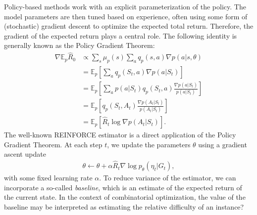 \documentclass[a4paper]{article}
\theoremstyle{definition}
\theoremstyle{plain}
\begin{document}
Policy-based methods work with an explicit parameterization of the policy. The
model parameters are then tuned based on experience, often using some form of
(stochastic) gradient descent to optimize the expected total return.
%
Therefore, the gradient of the expected return
plays a central role. The
following identity is generally known as the Policy Gradient Theorem:
\begin{align*}
  \nabla \mathbb{E}_{p} \hat{R}_{0} &\propto \sum_{s} \mu_{p}(s) \sum_{a} q_{p}(s, a) \nabla p(a | s, \theta) \\
  &= \mathbb{E}_{p}\left[ \sum_{a} q_{p} (S_{t}, a) \nabla p (a | S_{t}) \right] \\
  &= \mathbb{E}_{p}\left[ \sum_{a} p(a | S_{t}) q_{p} (S_{t}, a) \frac{\nabla p (a | S_{t})}{p (a | S_{t})} \right] \\
  &= \mathbb{E}_{p}\left[ q_{p} (S_{t}, A_{t}) \frac{\nabla p (A_{t} | S_{t})}{p (A_{t} | S_{t})} \right] \\
  &= \mathbb{E}_{p} \left[ \hat{R}_{t} \log \nabla p (A_{t} | S_{t}) \right] .
\end{align*}
%
The well-known REINFORCE estimator is a direct application of the Policy
Gradient Theorem. At each step $t$, we update the parameters $\theta$ using a
gradient ascent update
\begin{align*}
  \theta \leftarrow \theta + \alpha \hat{R}_{t} \nabla \log p_{\theta}(\eta_{t} | G_{t}) ,
\end{align*}
with some fixed learning rate $\alpha$.
To reduce variance of the estimator, we can incorporate a so-called
\textit{baseline}, which is an estimate of the expected return of the current
state.
%
In the context of combinatorial optimization, the value of the baseline may be
interpreted as estimating the relative difficulty of an instance?
\end{document}
